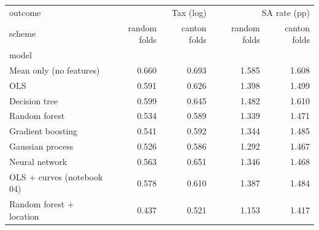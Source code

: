 \begin{tabular}{lrrrr}
\toprule
outcome & \multicolumn{2}{r}{Tax (log)} & \multicolumn{2}{r}{SA rate (pp)} \\
scheme & random folds & canton folds & random folds & canton folds \\
model &  &  &  &  \\
\midrule
Mean only (no features) & 0.660 & 0.693 & 1.585 & 1.608 \\
OLS & 0.591 & 0.626 & 1.398 & 1.499 \\
Decision tree & 0.599 & 0.645 & 1.482 & 1.610 \\
Random forest & 0.534 & 0.589 & 1.339 & 1.471 \\
Gradient boosting & 0.541 & 0.592 & 1.344 & 1.485 \\
Gaussian process & 0.526 & 0.586 & 1.292 & 1.467 \\
Neural network & 0.563 & 0.651 & 1.346 & 1.468 \\
OLS + curves (notebook 04) & 0.578 & 0.610 & 1.387 & 1.484 \\
Random forest + location & 0.437 & 0.521 & 1.153 & 1.417 \\
\bottomrule
\end{tabular}

